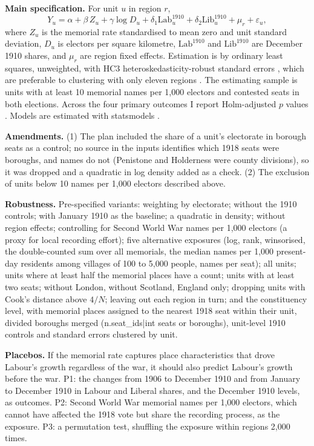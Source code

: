 \documentclass[11pt,a4paper]{article}
\begin{document}
\textbf{Main specification.} For unit $u$ in region $r$,
\begin{equation}
Y_u = \alpha + \beta\, Z_u + \gamma \log D_u + \delta_1 \text{Lab}^{1910}_u + \delta_2 \text{Lib}^{1910}_u + \mu_r + \varepsilon_u,
\end{equation}
where $Z_u$ is the memorial rate standardised to mean zero and unit standard deviation, $D_u$ is electors per square kilometre, $\text{Lab}^{1910}$ and $\text{Lib}^{1910}$ are December 1910 shares, and $\mu_r$ are region fixed effects. Estimation is by ordinary least squares, unweighted, with HC3 heteroskedasticity-robust standard errors \citep{mackinnon1985}, which are preferable to clustering with only eleven regions \citep{cameron2015}. The estimating sample is units with at least 10 memorial names per 1,000 electors and contested seats in both elections. Across the four primary outcomes I report Holm-adjusted $p$ values \citep{holm1979}. Models are estimated with statsmodels \citep{seabold2010}.

\textbf{Amendments.} (1) The plan included the share of a unit's electorate in borough seats as a control; no source in the inputs identifies which 1918 seats were boroughs, and names do not (Penistone and Holderness were county divisions), so it was dropped and a quadratic in log density added as a check. (2) The exclusion of units below 10 names per 1,000 electors described above.

\textbf{Robustness.} Pre-specified variants: weighting by electorate; without the 1910 controls; with January 1910 as the baseline; a quadratic in density; without region effects; controlling for Second World War names per 1,000 electors (a proxy for local recording effort); five alternative exposures (log, rank, winsorised, the double-counted sum over all memorials, the median names per 1,000 present-day residents among villages of 100 to 5,000 people, names per seat); all units; units where at least half the memorial places have a count; units with at least two seats; without London, without Scotland, England only; dropping units with Cook's distance above $4/N$; leaving out each region in turn; and the constituency level, with memorial places assigned to the nearest 1918 seat within their unit, divided boroughs merged ({{n.seat_ids|int}} seats or boroughs), unit-level 1910 controls and standard errors clustered by unit.

\textbf{Placebos.} If the memorial rate captures place characteristics that drove Labour's growth regardless of the war, it should also predict Labour's growth before the war. P1: the changes from 1906 to December 1910 and from January to December 1910 in Labour and Liberal shares, and the December 1910 levels, as outcomes. P2: Second World War memorial names per 1,000 electors, which cannot have affected the 1918 vote but share the recording process, as the exposure. P3: a permutation test, shuffling the exposure within regions 2,000 times.
\end{document}
